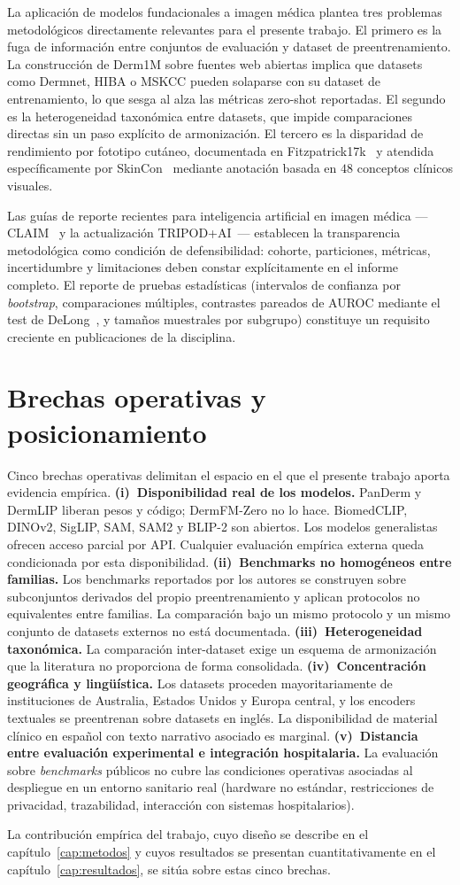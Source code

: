 La aplicación de modelos fundacionales a imagen médica plantea tres
problemas metodológicos directamente relevantes para el presente
trabajo. El primero es la fuga de información entre conjuntos de
evaluación y dataset de preentrenamiento. La construcción de Derm1M
sobre fuentes web abiertas implica que datasets como Dermnet, HIBA
o MSKCC pueden solaparse con su dataset de entrenamiento, lo que
sesga al alza las métricas zero-shot reportadas. El segundo es la
heterogeneidad taxonómica entre datasets, que impide comparaciones
directas sin un paso explícito de armonización. El tercero es la
disparidad de rendimiento por fototipo cutáneo, documentada en
Fitzpatrick17k~\cite{fitzpatrick17k} y atendida específicamente por
SkinCon~\cite{skincon} mediante anotación basada en $48$
conceptos clínicos visuales.

Las guías de reporte recientes para inteligencia artificial en
imagen médica ---CLAIM~\cite{claim2024} y la actualización
TRIPOD+AI~\cite{tripodai2024}--- establecen la transparencia metodológica como
condición de defensibilidad: cohorte, particiones, métricas,
incertidumbre y limitaciones deben constar explícitamente en el
informe completo. El reporte de pruebas estadísticas (intervalos de
confianza por \emph{bootstrap}, comparaciones múltiples,
contrastes pareados de AUROC mediante el test de
DeLong~\cite{delong1988}, y tamaños muestrales por subgrupo)
constituye un requisito creciente en publicaciones de la disciplina.

\section{Brechas operativas y posicionamiento}
\label{sec:brecha}

Cinco brechas operativas delimitan el espacio en el que el presente
trabajo aporta evidencia empírica. \textbf{(i)~Disponibilidad real
de los modelos.} PanDerm y DermLIP liberan pesos y código;
DermFM-Zero no lo hace. BiomedCLIP, DINOv2, SigLIP, SAM, SAM2 y
BLIP-2 son abiertos. Los modelos generalistas ofrecen acceso parcial
por API. Cualquier evaluación empírica externa queda condicionada
por esta disponibilidad. \textbf{(ii)~Benchmarks no homogéneos entre
familias.} Los benchmarks reportados por los autores se construyen
sobre subconjuntos derivados del propio preentrenamiento y aplican
protocolos no equivalentes entre familias. La comparación bajo un
mismo protocolo y un mismo conjunto de datasets externos no está
documentada. \textbf{(iii)~Heterogeneidad taxonómica.} La
comparación inter-dataset exige un esquema de armonización que la
literatura no proporciona de forma consolidada.
\textbf{(iv)~Concentración geográfica y lingüística.} Los datasets
proceden mayoritariamente de instituciones de Australia, Estados
Unidos y Europa central, y los encoders textuales se preentrenan
sobre datasets en inglés. La disponibilidad de material clínico en
español con texto narrativo asociado es marginal.
\textbf{(v)~Distancia entre evaluación experimental e integración
hospitalaria.} La evaluación sobre \emph{benchmarks} públicos no
cubre las condiciones operativas asociadas al despliegue en un
entorno sanitario real (hardware no estándar, restricciones de
privacidad, trazabilidad, interacción con sistemas hospitalarios).

La contribución empírica del trabajo, cuyo diseño se describe en el
capítulo~\ref{cap:metodos} y cuyos resultados se presentan
cuantitativamente en el capítulo~\ref{cap:resultados}, se sitúa
sobre estas cinco brechas.

